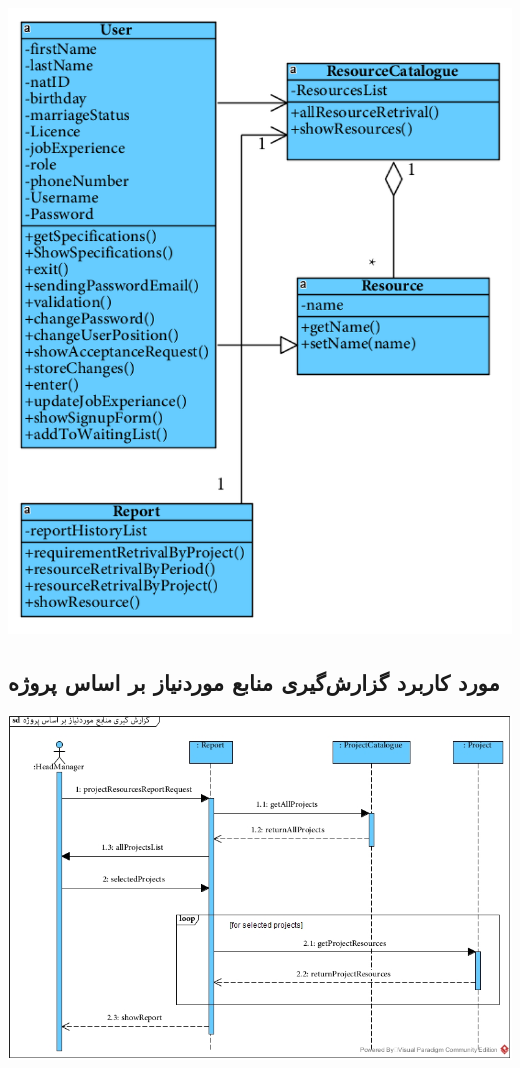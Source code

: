 \newpage
\vspace{2cm}
\begin{center}
\includegraphics[width=\textwidth]{SequenceClasses/41.png}
\end{center}

\newpage
\vspace{2cm}
\subsection*{مورد کاربرد گزارش‌گیری منابع موردنیاز بر اساس پروژه}
\vspace{2cm}
\begin{center}
\includegraphics[width=\textwidth]{SequenceDiagrams/42.jpg}
\end{center}

